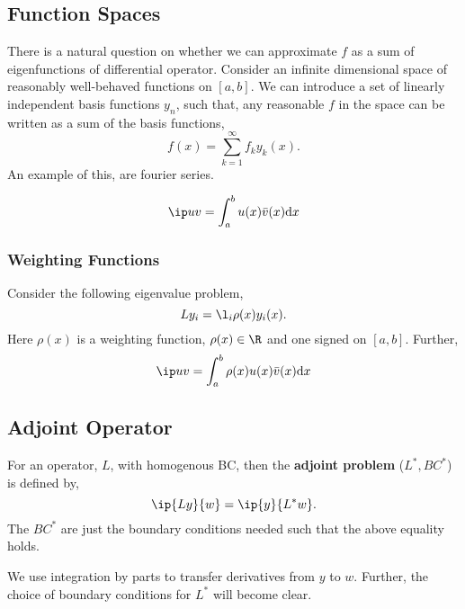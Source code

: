 \subsection{Function Spaces}
There is a natural question on whether we can approximate $f$ as a sum of eigenfunctions of differential operator. Consider an infinite dimensional space of reasonably well-behaved functions on $[a, b]$. We can introduce a set of linearly independent basis functions $y_n$, such that, any reasonable $f$ in the space can be written as a sum of the basis functions,
$$ f(x) = \sum_{k=1}^\infty f_ky_k(x). $$
An example of this, are fourier series.

\begin{ndefi}
  $$ \ip u v = \int_a^b u(x)\bar v(x)\mathrm{d}x $$
\end{ndefi}

\subsubsection{Weighting Functions}
Consider the following eigenvalue problem,
$$ Ly_i = \l_i \rho(x) y_i(x). $$
Here $\rho(x)$ is a weighting function, $\rho(x) \in \R$ and one signed on $[a, b]$. Further,
$$ \ip u v = \int_a^b \rho(x)u(x)\bar v(x)\mathrm{d}x $$

\subsection{Adjoint Operator}
\begin{ndefi}[]
  For an operator, $L$, with homogenous BC, then the \textbf{adjoint problem} ($L^*, BC^*$) is defined by,
  $$ \ip{Ly}{w} = \ip{y}{L^*w}. $$
  The $BC^*$ are just the boundary conditions needed such that the above equality holds.
\end{ndefi}

\begin{note}
  We use integration by parts to transfer derivatives from $y$ to $w$. Further, the choice of boundary conditions for $L^*$ will become clear.
\end{note}

